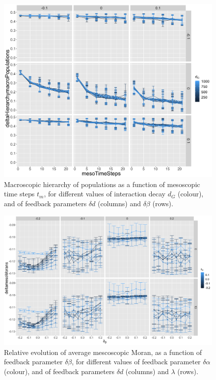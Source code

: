 \documentclass[11pt]{article}
\begin{document}
\begin{figure}[h!]
	\includegraphics[width=\linewidth]{deltaHierarchymacroPopulations-mesoTimeSteps_colorMacroInteractionDecay_facetmesoMacroDecayUpdateMax-macroMesoBetaUpdateMax.png}
	\caption{Macroscopic hierarchy of populations as a function of mesoscopic time steps $t_m$, for different values of interaction decay $d_G$ (colour), and of feedback parameters $\delta d$ (columns) and $\delta \beta$ (rows).\label{fig:fig4}}
\end{figure}


\begin{figure}[h!]
	\includegraphics[width=\linewidth]{deltamesoMorans-macroMesoAlphaUpdateMax_colormacroMesoBetaUpdateMax_facetmesoMacroCongestionCost-mesoMacroDecayUpdateMax_mesoBeta0_11.png}
	\caption{Relative evolution of average mescoscopic Moran, as a function of feedback parameter $\delta \beta$, for different values of feedback parameter $\delta \alpha$ (colour), and of feedback parameters $\delta d$ (columns) and $\lambda$ (rows).\label{fig:fig5}}
\end{figure}
\end{document}
